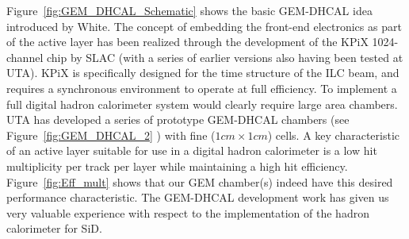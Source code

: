 Figure~\ref{fig:GEM_DHCAL_Schematic} shows the basic GEM-DHCAL idea introduced by White. The concept of embedding the front-end 
electronics as part of the active layer has been realized through the development of the KPiX 1024-channel chip by SLAC (with a series of 
earlier versions also having been tested at UTA). KPiX is specifically designed for the time structure of the ILC beam, and requires a 
synchronous environment to operate at full efficiency. To implement a full digital hadron calorimeter system would clearly require 
large area chambers. UTA has developed a series of prototype GEM-DHCAL chambers (see Figure~\ref{fig:GEM_DHCAL_2} ) with fine ($1cm \times 1cm$) cells. 
A key characteristic of an active layer suitable for use in a digital hadron calorimeter is a low hit multiplicity per track per layer 
while maintaining a high hit efficiency. Figure~\ref{fig:Eff_mult} shows that our GEM chamber(s) indeed have this desired
performance characteristic. The GEM-DHCAL development work has given us very valuable experience with respect to the implementation
of the hadron calorimeter for SiD.

